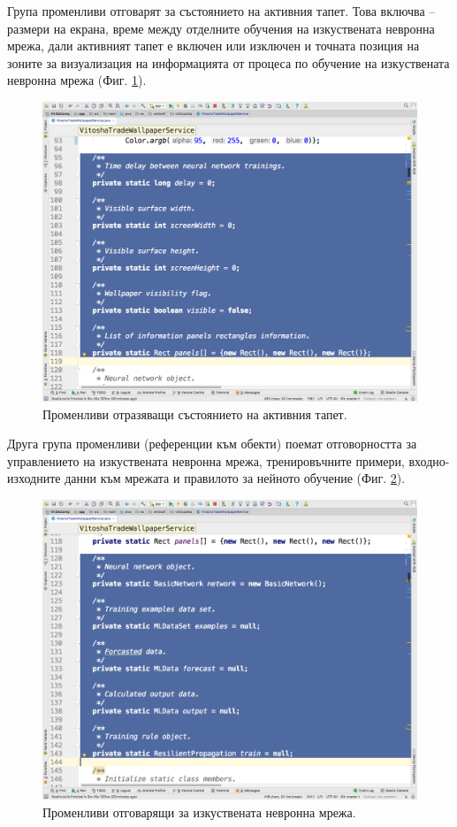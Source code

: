 \documentclass[book,14pt,oneside,openany]{memoir}
\begin{document}
Група променливи отговарят за състоянието на активния тапет. Това включва – размери на екрана, време между отделните обучения на изкуствената невронна мрежа, дали активният тапет е включен или изключен и точната позиция на зоните за визуализация на информацията от процеса по обучение на изкуствената невронна мрежа (Фиг. \ref{fig:pic0033}). 

\begin{figure}[h]
  \centering
  \includegraphics[height=0.45\pdfpageheight]{./images/pic0033.png}
  \caption{Променливи отразяващи състоянието на активния тапет.}
\label{fig:pic0033}
\end{figure}
\FloatBarrier

Друга група променливи (референции към обекти) поемат отговорността за управлението на изкуствената невронна мрежа, тренировъчните примери, входно-изходните данни към мрежата и правилото за нейното обучение (Фиг. \ref{fig:pic0034}).

\begin{figure}[h]
  \centering
  \includegraphics[height=0.45\pdfpageheight]{./images/pic0034.png}
  \caption{Променливи отговарящи за изкуствената невронна мрежа.}
\label{fig:pic0034}
\end{figure}
\FloatBarrier
\end{document}
